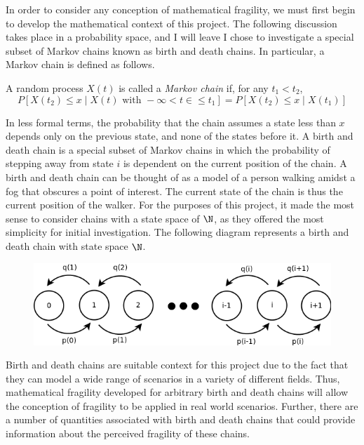 In order to consider any conception of mathematical fragility, we must first begin to develop the
mathematical context of this project. The following discussion takes place in a probability space, and I
will leave I chose to investigate a special subset of Markov chains known as
birth and death chains. In particular, a Markov chain is defined as follows.
\begin{definition}
    A random process $X(t)$ is called a \emph{Markov chain} if, for any $t_1 < t_2$,
    \[
        P[X(t_2) \leq x \mid X(t) \text{ with } -\infty < t \in \leq t_1] = P[X(t_2) \leq x \mid X(t_1)]   
    \]
\end{definition}
In less formal terms, the probability that the chain assumes a state less than $x$ depends only on the
previous state, and none of the states before it. A birth and death chain is a special subset of Markov
chains in which the probability of stepping away from state $i$ is dependent on the current position of
the chain. A birth and death chain can be thought of as a model of a person walking amidst a fog that
obscures a point of interest. The current state of the chain is thus the current position of the walker.
For the purposes of this project, it made the most sense to consider chains with a state space of $\N$,
as they offered the most simplicity for initial investigation. The following diagram represents a birth
and death chain with state space $\N$.

\noindent
\begin{figure}[H]
    \begin{center}
        \includegraphics[width=\textwidth]{plots/birthdeathdia.png}
    \end{center}
\end{figure}

Birth and death chains are suitable context for this project due to the fact that they can model a wide
range of scenarios in a variety of different fields. Thus, mathematical fragility developed for
arbitrary birth and death chains will allow the conception of fragility to be applied in real world
scenarios. Further, there are a number of quantities associated with birth and death chains that could
provide information about the perceived fragility of these chains.
